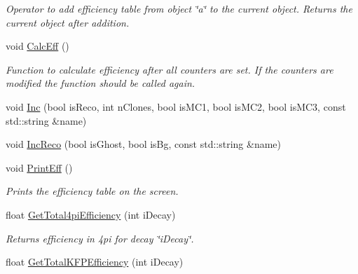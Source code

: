 \begin{DoxyCompactItemize}
\begin{DoxyCompactList}\small\item\em Operator to add efficiency table from object \char`\"{}a\char`\"{} to the current object. Returns the current object after addition. \end{DoxyCompactList}\item 
void \hyperlink{classKFPartEfficiencies_a171017b3a8cc125461be0dea84d8d99a}{Calc\+Eff} ()\hypertarget{classKFPartEfficiencies_a171017b3a8cc125461be0dea84d8d99a}{}\label{classKFPartEfficiencies_a171017b3a8cc125461be0dea84d8d99a}

\begin{DoxyCompactList}\small\item\em Function to calculate efficiency after all counters are set. If the counters are modified the function should be called again. \end{DoxyCompactList}\item 
void \hyperlink{classKFPartEfficiencies_ac5b13032d4d04564f696e0db9f544579}{Inc} (bool is\+Reco, int n\+Clones, bool is\+M\+C1, bool is\+M\+C2, bool is\+M\+C3, const std\+::string \&name)
\item 
void \hyperlink{classKFPartEfficiencies_a1ed4b9e456cafe92158ad43b9da1b816}{Inc\+Reco} (bool is\+Ghost, bool is\+Bg, const std\+::string \&name)
\item 
void \hyperlink{classKFPartEfficiencies_aae337f341af9595cd68f532e717e228a}{Print\+Eff} ()\hypertarget{classKFPartEfficiencies_aae337f341af9595cd68f532e717e228a}{}\label{classKFPartEfficiencies_aae337f341af9595cd68f532e717e228a}

\begin{DoxyCompactList}\small\item\em Prints the efficiency table on the screen. \end{DoxyCompactList}\item 
float \hyperlink{classKFPartEfficiencies_a6a48c0c6ded2a21062f73ba917229f6d}{Get\+Total4pi\+Efficiency} (int i\+Decay)\hypertarget{classKFPartEfficiencies_a6a48c0c6ded2a21062f73ba917229f6d}{}\label{classKFPartEfficiencies_a6a48c0c6ded2a21062f73ba917229f6d}

\begin{DoxyCompactList}\small\item\em Returns efficiency in 4pi for decay \char`\"{}i\+Decay\char`\"{}. \end{DoxyCompactList}\item 
float \hyperlink{classKFPartEfficiencies_ae896d8f2622dc6405584da3d4002eb40}{Get\+Total\+K\+F\+P\+Efficiency} (int i\+Decay)\hypertarget{classKFPartEfficiencies_ae896d8f2622dc6405584da3d4002eb40}{}\label{classKFPartEfficiencies_ae896d8f2622dc6405584da3d4002eb40}


\end{DoxyCompactItemize}
